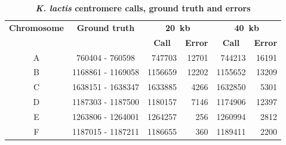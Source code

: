 \begin{table}[ht!]
\caption{\textbf{\textit{K. lactis} centromere calls, ground truth and errors}}
\begin{center}
\begin{tabular}{c | c  r  r  r  r}
\textbf{Chromosome}  & \textbf{Ground truth} & \multicolumn{2}{c}{\textbf{20~kb}} & \multicolumn{2}{c}{\textbf{40~kb}} \\
  &   &  \multicolumn{1}{c}{\textbf{Call}} &  \multicolumn{1}{c}{\textbf{Error}} &  \multicolumn{1}{c}{\textbf{Call}} &  \multicolumn{1}{c}{\textbf{Error}} \\
\hline
A & \num[group-separator={\,}]{760404} - \num[group-separator={\,}]{760598} & \num[group-separator={\,}]{747703} & \small{\num[group-separator={\,}]{12701}}  & \num[group-separator={\,}]{744213} & \small{\num[group-separator={\,}]{16191}}  \\
B & \num[group-separator={\,}]{1168861} - \num[group-separator={\,}]{1169058} & \num[group-separator={\,}]{1156659} & \small{\num[group-separator={\,}]{12202}}  & \num[group-separator={\,}]{1155652} & \small{\num[group-separator={\,}]{13209}}  \\
C & \num[group-separator={\,}]{1638151} - \num[group-separator={\,}]{1638347} & \num[group-separator={\,}]{1633885} & \small{\num[group-separator={\,}]{4266}}  & \num[group-separator={\,}]{1632850} & \small{\num[group-separator={\,}]{5301}}  \\
D & \num[group-separator={\,}]{1187303} - \num[group-separator={\,}]{1187500} & \num[group-separator={\,}]{1180157} & \small{\num[group-separator={\,}]{7146}}  & \num[group-separator={\,}]{1174906} & \small{\num[group-separator={\,}]{12397}}  \\
E & \num[group-separator={\,}]{1263806} - \num[group-separator={\,}]{1264001} & \num[group-separator={\,}]{1264257} & \small{\num[group-separator={\,}]{256}}  & \num[group-separator={\,}]{1260994} & \small{\num[group-separator={\,}]{2812}}  \\
F & \num[group-separator={\,}]{1187015} - \num[group-separator={\,}]{1187211} & \num[group-separator={\,}]{1186655} & \small{\num[group-separator={\,}]{360}}  & \num[group-separator={\,}]{1189411} & \small{\num[group-separator={\,}]{2200}}  \\
\end{tabular}
\end{center}
\end{table}

\clearpage



